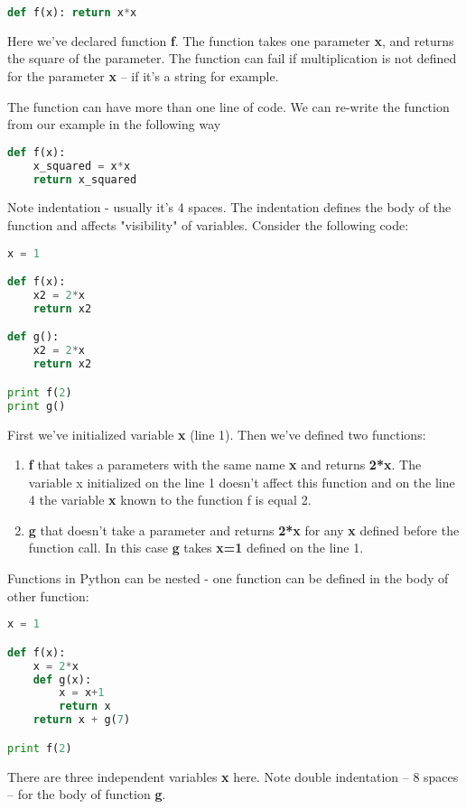 \begin{lstlisting}[style=codelst2,language=Python,caption={First function}]
def f(x): return x*x
\end{lstlisting}

Here we've declared function \textbf{f}. The function
 takes one parameter \textbf{x},
and returns the square of the parameter. The function
can fail if multiplication is not defined for the parameter \textbf{x} --
if it's a string for example. 

The function can have more than one line of code. We can re-write
the function from our example in the following way

\begin{lstlisting}[style=codelst2,language=Python,caption={Multi-line function}]
def f(x):
    x_squared = x*x
    return x_squared
\end{lstlisting}
Note indentation - usually it's 4 spaces. The indentation defines
the body of the function and affects "visibility" of variables. 
Consider the following code:

\begin{lstlisting}[style=codelst2,language=Python,caption={Visibility of variables}]
x = 1

def f(x):
    x2 = 2*x
    return x2

def g():
    x2 = 2*x
    return x2

print f(2)
print g()
\end{lstlisting}
First we've initialized variable \textbf{x} (line 1). Then we've
defined two functions:

\begin{enumerate}
\item \textbf{f} that takes a parameters with the same
name \textbf{x} and returns \textbf{2*x}. The variable x initialized on
the line 1 doesn't affect this function and
on the line 4 the variable \textbf{x} known to
the function f is equal 2.
\item \textbf{g} that doesn't take a parameter and returns \textbf{2*x} for
any \textbf{x} defined before the function call. In this case \textbf{g}
takes \textbf{x=1} defined on the line 1.
\end{enumerate}

Functions in Python can be nested - one function can be defined in
the body of other function:

\begin{lstlisting}[style=codelst2,language=Python,caption={Nested functions}]
x = 1

def f(x):
    x = 2*x
    def g(x):
        x = x+1
        return x
    return x + g(7)

print f(2)
\end{lstlisting}
There are three independent variables \textbf{x} here.
Note double indentation -- 8 spaces -- for the body of function \textbf{g}.

